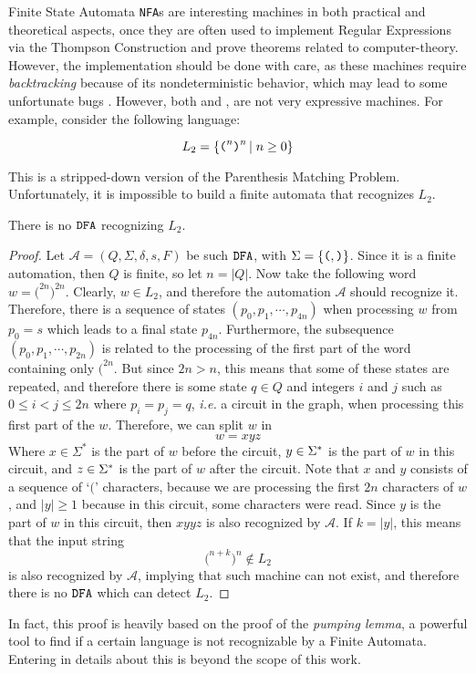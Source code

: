 \begin{section}{Finite State Automata}
\texttt{NFA}s are interesting machines in both practical and theoretical aspects,
once they are often used to implement Regular Expressions via the Thompson
Construction \citep{dragonbook} and prove theorems related to computer-theory.
However, the implementation should be done with care, as these machines require
\textit{backtracking} because of its nondeterministic behavior, which may lead
to some unfortunate bugs \citep{PR86164}. However, both \DFA and \NFA, are not
very expressive machines. For example, consider the following language:

$$L_2 = \{\texttt{(}^n \texttt{)}^n\,|\;n \geq 0\}$$

This is a stripped-down version of the Parenthesis Matching Problem.
Unfortunately, it is impossible to build a finite automata
that recognizes $L_2$.

\begin{lemma}
There is no $\texttt{DFA}$ recognizing $L_2$.
\end{lemma}
\begin{proof}
Let $\mathcal{A} = (Q, \Sigma, \delta, s, F)$ be such $\texttt{DFA}$,
with $\Sigma = \{\texttt{(}, \texttt{)}\}$.
Since it is a finite automation, then $Q$ is finite, so let
$n = |Q|$. Now take the following word $w = \texttt{(}^{2n}\texttt{)}^{2n}$.
Clearly, $w \in L_2$, and therefore the automation $\mathcal{A}$ should
recognize it. Therefore, there is a sequence of states
$(p_0, p_1, \cdots, p_{4n})$ when processing $w$ from $p_0 = s$ which leads to a
final state $p_{4n}$. Furthermore, the subsequence $(p_0, p_1, \cdots, p_{2n})$ is
related to the processing of the first part of the word containing only
$\texttt{(}^{2n}$. But since $2n > n$, this means that some of these
states are repeated, and therefore there is some state $q \in Q$ and integers
$i$ and $j$ such as $0 \leq i < j \leq 2n$ where $p_i = p_j = q$,
\textit{i.e.} a circuit in the graph, when processing this first part of the $w$.
Therefore, we can split $w$ in 
$$w = xyz$$
Where $x \in \Sigma^*$ is the part of $w$ before the circuit, $y \in \Sigma^*$ is
the part of $w$ in this circuit, and $z \in \Sigma^*$ is the part of $w$ after the
circuit. Note that $x$ and $y$ consists of a sequence of `$\texttt{(}$'
characters, because we are processing the first $2n$ characters of $w$,
and $|y| \geq 1$ because in this circuit, some characters were
read.
Since $y$ is the part of $w$ in this circuit, then
$ xyyz $
is also recognized by $\mathcal{A}$. If $k = |y|$, this means that
the input string
$$ \texttt{(}^{n+k}\texttt{)}^n \not\in L_2$$
is also recognized by $\mathcal{A}$, implying that such machine can
not exist, and therefore there is no $\texttt{DFA}$ which can detect
$L_2$.
\end{proof}

In fact, this proof is heavily based on the proof of the \textit{pumping lemma},
a powerful tool to find if a certain language is not recognizable by a
Finite Automata. Entering in details about this is beyond the scope of
this work.

\end{section}

